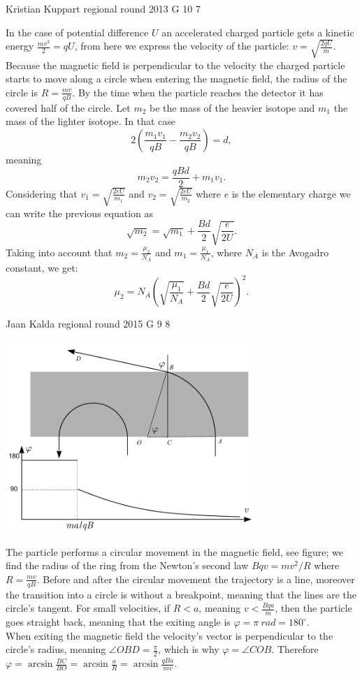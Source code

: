 \documentclass[11pt]{article}
\begin{document}
{Kristian Kuppart} %
{regional round} %
{2013} %
{G 10} %
{7} %
{

\ifEngSolution
In the case of potential difference $U$ an accelerated charged particle gets a kinetic energy $\frac{mv^{2}}{2}=qU$, from here we express the velocity of the particle: $v=\sqrt{\frac{2qU}{m}}$. Because the magnetic field is perpendicular to the velocity the charged particle starts to move along a circle when entering the magnetic field, the radius of the circle is $R=\frac{mv}{qB}$. By the time when the particle reaches the detector it has covered half of the circle. Let $m_{2}$ be the mass of the heavier isotope and $m_{1}$ the mass of the lighter isotope. In that case
\[ 
2\left(\frac{m_{1}v_{1}}{qB}-\frac{m_{2}v_{2}}{qB}\right)=d, 
\]
meaning 
\[ 
m_{2}v_{2}=\frac{qBd}{2}+m_{1}v_{1 }.
\]
Considering that $v_{1}=\sqrt{\frac{2eU}{m_{1}}}$ and $v_{2}=\sqrt{\frac{2eU}{m_{2}}}$ where $e$ is the elementary charge we can write the previous equation as 
\[ \sqrt{m_{2}}=\sqrt{m_{1}}+\frac{Bd}{2}\sqrt{\frac{e}{2U}}. \]
Taking into account that $m_{2}=\frac{\mu_{2}}{N_{A}}$ and $m_{1}=\frac{\mu_{1}}{N_{A}}$, where $N_{A}$ is the Avogadro constant, we get:
\[ \mu_{2}=N_{A}\left(\sqrt{\frac{\mu_{1}}{N_{A}}}+\frac{Bd}{2}\sqrt{\frac{e}{2U}}\right)^{2}.\]
\fi
}

{Jaan Kalda} %
{regional round} %
{2015} %
{G 9} %
{8} %
{

\ifEngSolution
\begin{center}
\includegraphics[width=0.7\textwidth]{2015-v2g-09-magnetvalilah}
\end{center}
The particle performs a circular movement in the magnetic field, see figure; we find the radius of the ring from the Newton’s second law $Bqv=mv^2/R$ where $R=\frac{mv}{qB}$. Before and after the circular movement the trajectory is a line, moreover the transition into a circle is without a breakpoint, meaning that the lines are the circle’s tangent. For small velocities, if $R<a$, meaning $v<\frac{Bqa}{m}$, then the particle goes straight back, meaning that the exiting angle is $\varphi=\pi \SI{}{rad}=180^\circ$.\\
When exiting the magnetic field the velocity’s vector is perpendicular to the circle’s radius, meaning $\angle OBD=\frac \pi 2$, which is why $\varphi=\angle COB$. Therefore $\varphi=\arcsin \frac{BC}{BO}=\arcsin \frac{a}{R}=\arcsin \frac{qBa}{mv}$.
\fi
}
\end{document}
